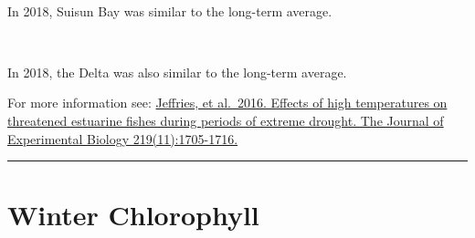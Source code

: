 \documentclass[
]{book}
\begin{document}
\begin{panel-grid}
\begin{columns-nocenter}
\begin{column40}
~

\end{column40}

\begin{column800}

In 2018, Suisun Bay was similar to the long-term average.

\end{column800}

\begin{column40}

~

\end{column40}

\begin{column800}

In 2018, the Delta was also similar to the long-term average.

\end{column800}

\end{columns-nocenter}

\end{panel-grid}

\begin{disclaimer}
For more information see:
\href{https://jeb.biologists.org/content/219/11/1705.short}{Jeffries, et
al.~2016. Effects of high temperatures on threatened estuarine fishes
during periods of extreme drought. The Journal of Experimental Biology
219(11):1705-1716.}
\end{disclaimer}

\begin{center}\rule{0.5\linewidth}{0.5pt}\end{center}

\hypertarget{winter-chlorophyll}{%
\section{Winter Chlorophyll}\label{winter-chlorophyll}}
\end{document}
